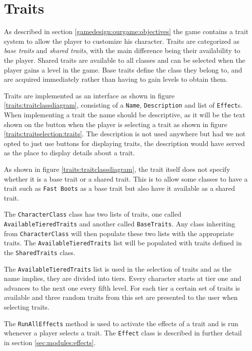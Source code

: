 \section{Traits}
\label{sec:modules:traits}

As described in section \ref{gamedesign:ourgame:objectives} the game contains a trait system to allow the player to customize his character.
Traits are categorized as \textit{base traits} and \textit{shared traits}, with the main difference being their availability to the player.
Shared traits are available to all classes and can be selected when the player gains a level in the game.
Base traits define the class they belong to, and are acquired immediately rather than having to gain levels to obtain them.

Traits are implemented as an interface as shown in figure \ref{traits:traitclassdiagram}, consisting of a \texttt{Name}, \texttt{Description} and list of \texttt{Effect}s.
When implementing a trait the name should be descriptive, as it will be the text shown on the button when the player is selecting a trait as shown in figure \ref{traits:traitselection:traits}. 
The description is not used anywhere but had we not opted to just use buttons for displaying traits, the description would have served as the place to display details about a trait.

As shown in figure \ref{traits:traitclassdiagram}, the trait itself does not specify whether it is a base trait or a shared trait.
This is to allow some classes to have a trait such as \texttt{Fast Boots} as a base trait but also have it available as a shared trait.

The \texttt{CharacterClass} class has two lists of traits, one called \texttt{AvailableTieredTraits} and another called \texttt{BaseTraits}.
Any class inheriting from \texttt{CharacterClass} will then populate these two lists with the appropriate traits.
The \texttt{AvailableTieredTraits} list will be populated with traits defined in the \texttt{SharedTraits} class.

The \texttt{AvailableTieredTraits} list is used in the selection of traits and as the name implies, they are divided into tiers.
Every character starts at tier one and advances to the next one every fifth level.
For each tier a certain set of traits is available and three random traits from this set are presented to the user when selecting traits.

The \texttt{RunAllEffects} method is used to activate the effects of a trait and is run whenever a player selects a trait.
The \texttt{Effect} class is described in further detail in section \ref{sec:modules:effects}.


